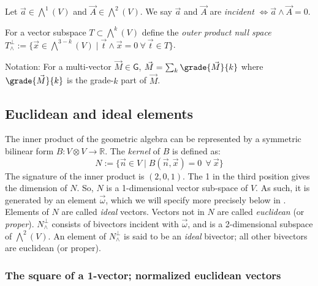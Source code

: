 \documentclass{birkjour}
\newcommand{\vsp}{V\xspace}
\begin{document}
\begin{compactenum}[$\bullet$]
\item Let $\vec{a}\in \bigwedge^{1}({V})$ and $\vec{A} \in \bigwedge^{2}({V})$.   We say $\vec{a}$ and $\vec{A}$ are \emph{incident} $\iff \vec{a} \wedge \vec{A}= 0$.
\item For a vector subspace ${T} \subset \bigwedge^{k}({V})$ define the \emph{outer product null space} ${T}_{\wedge}^{\perp} := \{\vec{x} \in \bigwedge^{3-k}({V})\mid \vec{t} \wedge \vec{x} = 0~ \forall~\vec{t} \in {T}\}$.%
\item Notation: For a multi-vector $\vec{M} \in \textsf{G}$, $\vec{M} = \sum_{k}\grade{\vec{M}}{k}$ where $\grade{\vec{M}}{k}$ is the grade-$k$ part of $\vec{M}$.
\end{compactenum}

\subsection{Euclidean and ideal elements}  
The inner product of the geometric algebra can be represented by a symmetric bilinear form $B : \vsp \otimes \vsp\rightarrow \mathbb{R}$. 
The \emph{kernel} of $B$ is defined as:  \[N := \{\vec{n} \in \vsp \mid B(\vec{n},\vec{x}) = 0~~\forall ~\vec{x}\}\]   
The signature of the inner product is $(2,0,1)$.  The 1 in the third position gives the dimension of $N$.  So, $N$ is a 1-dimensional vector sub-space of $\vsp$.  As such, it is generated by an element $\vec{\omega}$, which we will specify more precisely below in .  Elements of $N$ are called \emph{ideal} vectors. %
Vectors not in $N$ are called \emph{euclidean} (or \emph{proper}).  $N^{\perp}_{\wedge}$ consists of bivectors incident with $\vec{\omega}$, and is a 2-dimensional subspace of $\bigwedge^{2}(\vsp)$.  %
An element of $N^{\perp}_{\wedge}$ is said to be an \emph{ideal} bivector; all other bivectors are euclidean (or proper).

\subsubsection{The square of a 1-vector; normalized euclidean vectors}
\end{document}
